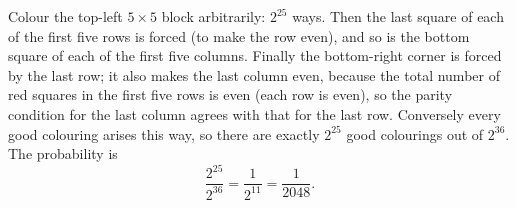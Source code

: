 Colour the top-left $5\times5$ block arbitrarily: $2^{25}$ ways. Then the last square of each of the first five rows is forced (to make the row even), and so is the bottom square of each of the first five columns. Finally the bottom-right corner is forced by the last row; it also makes the last column even, because the total number of red squares in the first five rows is even (each row is even), so the parity condition for the last column agrees with that for the last row. Conversely every good colouring arises this way, so there are exactly $2^{25}$ good colourings out of $2^{36}$. The probability is
\[
\dfrac{2^{25}}{2^{36}}=\dfrac{1}{2^{11}}=\boxed{\dfrac{1}{2048}} .
\]
